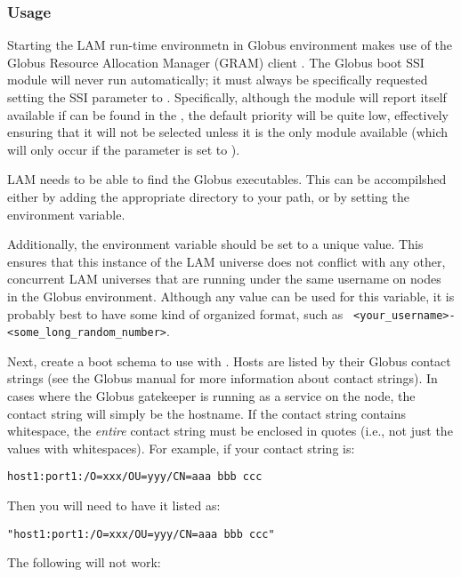\subsubsection{Usage}

Starting the LAM run-time environmetn in Globus environment makes use
of the Globus Resource Allocation Manager (GRAM) client
.
%
The Globus boot SSI module will never run automatically; it must
always be specifically requested setting the  SSI
parameter to .  Specifically, although the
 module will report itself available if
 can be found in the , the default
priority will be quite low, effectively ensuring that it will not be
selected unless it is the only module available (which will only occur
if the  parameter is set to ).

LAM needs to be able to find the Globus executables.  This can be
accompilshed either by adding the appropriate directory to your path,
or by setting the  environment variable.

Additionally, the 
environment variable should be set to a unique value.  This ensures
that this instance of the LAM universe does not conflict with any
other, concurrent LAM universes that are running under the same
username on nodes in the Globus environment.  Although any value can
be used for this variable, it is probably best to have some kind of
organized format, such as {\tt
  <your\_\-username>-<some\_\-long\_\-random\_\-number>}.

Next, create a boot schema to use with .
%
Hosts are listed by their Globus contact strings (see the Globus
manual for more information about contact strings).  In cases where
the Globus gatekeeper is running as a  service on the node,
the contact string will simply be the hostname.  If the contact string
contains whitespace, the {\em entire} contact string must be enclosed
in quotes (i.e., not just the values with whitespaces).
%
For example, if your contact string is:

\centerline{\tt host1:port1:/O=xxx/OU=yyy/CN=aaa bbb ccc}

Then you will need to have it listed as:
    
\centerline{\tt "host1:port1:/O=xxx/OU=yyy/CN=aaa bbb ccc"}

The following will not work:
  
